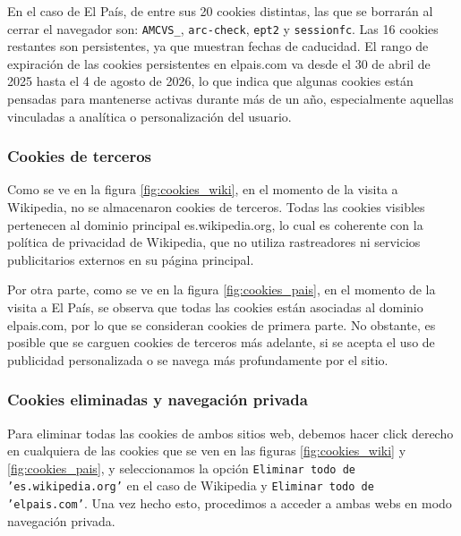 En el caso de El País, de entre sus 20 cookies distintas, las que se borrarán al cerrar el navegador son: \texttt{AMCVS\_}, \texttt{arc-check}, \texttt{ept2} y \texttt{sessionfc}. Las 16 cookies restantes son persistentes, ya que muestran fechas de caducidad. El rango de expiración de las cookies persistentes en elpais.com va desde el 30 de abril de 2025 hasta el 4 de agosto de 2026, lo que indica que algunas cookies están pensadas para mantenerse activas durante más de un año, especialmente aquellas vinculadas a analítica o personalización del usuario.

\subsubsection{Cookies de terceros}

Como se ve en la figura \ref{fig:cookies_wiki}, en el momento de la visita a Wikipedia, no se almacenaron cookies de terceros. Todas las cookies visibles pertenecen al dominio principal es.wikipedia.org, lo cual es coherente con la política de privacidad de Wikipedia, que no utiliza rastreadores ni servicios publicitarios externos en su página principal.

Por otra parte, como se ve en la figura \ref{fig:cookies_pais}, en el momento de la visita a El País, se observa que todas las cookies están asociadas al dominio elpais.com, por lo que se consideran cookies de primera parte. No obstante, es posible que se carguen cookies de terceros más adelante, si se acepta el uso de publicidad personalizada o se navega más profundamente por el sitio.

\subsubsection{Cookies eliminadas y navegación privada}

Para eliminar todas las cookies de ambos sitios web, debemos hacer click derecho en cualquiera de las cookies que se ven en las figuras \ref{fig:cookies_wiki} y \ref{fig:cookies_pais}, y seleccionamos la opción \texttt{Eliminar todo de 'es.wikipedia.org'} en el caso de Wikipedia y \texttt{Eliminar todo de 'elpais.com'}. Una vez hecho esto, procedimos a acceder a ambas webs en modo navegación privada.

